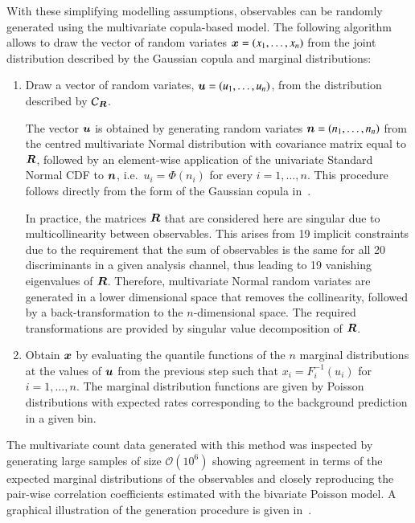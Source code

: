 With these simplifying modelling assumptions, observables can be randomly
generated using the multivariate copula-based model. The following algorithm
allows to draw the vector of random variates $\bm{x} = (x_1, \dots, x_n)$
from the joint distribution described by the Gaussian copula and marginal
distributions:
\begin{enumerate}
\item Draw a vector of random variates, $\bm{u} = (u_1, \dots, u_n)$, from
  the distribution described by $\mathcal{C}_{\bm{R}}$.

  The vector $\bm{u}$ is obtained by generating random variates
  $\bm{n} = (n_1, \dots, n_n)$ from the centred multivariate Normal
  distribution with covariance matrix equal to $\bm{R}$, followed by an
  element-wise application of the univariate Standard Normal CDF to $\bm{n}$,
  i.e.\ $u_i = \Phi(n_i)$ for every $i = 1, \dots, n$. This procedure follows
  directly from the form of the Gaussian copula in~.

  In practice, the matrices $\bm{R}$ that are considered here are singular
  due to multicollinearity between observables. This arises from 19 implicit
  constraints due to the requirement that the sum of observables is the same for
  all 20 discriminants in a given analysis channel, thus leading to 19 vanishing
  eigenvalues of $\bm{R}$. Therefore, multivariate Normal random variates are
  generated in a lower dimensional space that removes the collinearity, followed
  by a back-transformation to the $n$-dimensional space. The required
  transformations are provided by singular value decomposition of $\bm{R}$.

\item Obtain $\bm{x}$ by evaluating the quantile functions of the $n$
  marginal distributions at the values of $\bm{u}$ from the previous step
  such that $x_i = F_{i}^{-1}(u_i)$ for $i = 1, \dots, n$. The marginal
  distribution functions are given by Poisson distributions with expected rates
  corresponding to the background prediction in a given bin.
\end{enumerate}
The multivariate count data generated with this method was inspected by
generating large samples of size $\mathcal{O}(10^6)$ showing agreement in terms
of the expected marginal distributions of the observables and closely
reproducing the pair-wise correlation coefficients estimated with the bivariate
Poisson model. A graphical illustration of the generation procedure is given
in~.


